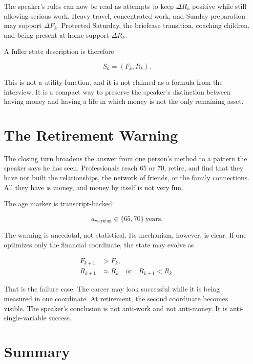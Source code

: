 The speaker's rules can now be read as attempts to keep \(\Delta R_k\) positive while still allowing serious work. Heavy travel, concentrated work, and Sunday preparation may support \(\Delta F_k\). Protected Saturday, the briefcase transition, coaching children, and being present at home support \(\Delta R_k\).

A fuller state description is therefore

\begin{equation}
S_k=(F_k,R_k).
\end{equation}

\begin{remark}
This is not a utility function, and it is not claimed as a formula from the interview. It is a compact way to preserve the speaker's distinction between having money and having a life in which money is not the only remaining asset.
\end{remark}

\section{The Retirement Warning}

The closing turn broadens the answer from one person's method to a pattern the speaker says he has seen. Professionals reach 65 or 70, retire, and find that they have not built the relationships, the network of friends, or the family connections. All they have is money, and money by itself is not very fun.

The age marker is transcript-backed:

\begin{equation}
a_{\text{warning}}
\in
\{65,70\}\ \text{years}.
\end{equation}

The warning is anecdotal, not statistical. Its mechanism, however, is clear. If one optimizes only the financial coordinate, the state may evolve as

\begin{align}
F_{k+1} &> F_k,\\
R_{k+1} &\approx R_k
\quad \text{or} \quad
R_{k+1}<R_k.
\end{align}

That is the failure case. The career may look successful while it is being measured in one coordinate. At retirement, the second coordinate becomes visible. The speaker's conclusion is not anti-work and not anti-money. It is anti-single-variable success.

\section{Summary}

